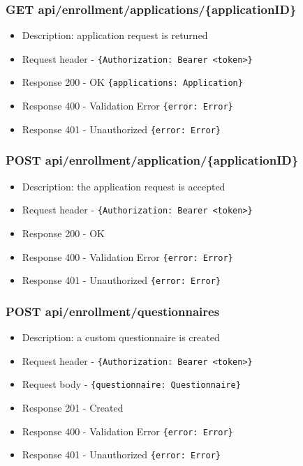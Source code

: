 \subsubsection{GET api/enrollment/applications/\{applicationID\}}
\begin{itemize}
    \item Description: application request is returned
    \item Request header - \verb|{Authorization: Bearer <token>}|
    \item Response 200 - OK \verb|{applications: Application}|
    \item Response 400 - Validation Error \verb|{error: Error}|
    \item Response 401 - Unauthorized \verb|{error: Error}|
\end{itemize}


\subsubsection{POST api/enrollment/application/\{applicationID\}}
\begin{itemize}
    \item Description: the application request is accepted
    \item Request header - \verb|{Authorization: Bearer <token>}|
    \item Response 200 - OK
    \item Response 400 - Validation Error \verb|{error: Error}|
    \item Response 401 - Unauthorized \verb|{error: Error}|
\end{itemize}

\subsubsection{POST api/enrollment/questionnaires}
\begin{itemize}
    \item Description: a custom questionnaire is created
    \item Request header - \verb|{Authorization: Bearer <token>}|
    \item Request body - \verb|{questionnaire: Questionnaire}|
    \item Response 201 - Created
    \item Response 400 - Validation Error \verb|{error: Error}|
    \item Response 401 - Unauthorized \verb|{error: Error}|
\end{itemize}

